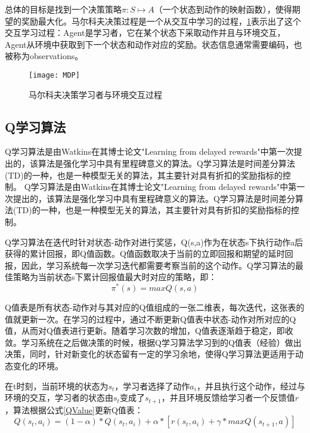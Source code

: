总体的目标是找到一个决策策略$\pi :S\longmapsto A$（一个状态到动作的映射函数），使得期望的奖励最大化。马尔科夫决策过程是一个从交互中学习的过程，\ref{Interaction}表示出了这个交互学习过程：Agent是学习者，它在某个状态下采取动作并且与环境交互，Agent从环境中获取到下一个状态和动作对应的奖励。状态信息通常需要编码，也被称为observations。
\begin{figure}[h]
    \centering
    \texttt{[image: MDP]}
    \caption{马尔科夫决策学习者与环境交互过程}
    \label{Interaction}
\end{figure}

\subsection{Q学习算法}
Q学习算法\cite{QLearning2}是由Watkins在其博士论文"Learning from delayed rewards"\cite{QLearning0}中第一次提出的，该算法是强化学习中具有里程碑意义的算法。Q学习算法是时间差分算法(TD)\cite{QLearning1}的一种，也是一种模型无关的算法，其主要针对具有折扣的奖励指标的控制。
Q学习算法\cite{QLearning2}是由Watkins在其博士论文"Learning from delayed rewards"\cite{QLearning0}中第一次提出的，该算法是强化学习中具有里程碑意义的算法。Q学习算法是时间差分算法(TD)\cite{QLearning1}的一种，也是一种模型无关的算法，其主要针对具有折扣的奖励指标的控制。

Q学习算法在迭代时针对状态-动作对进行奖惩，Q(s,a)作为在状态s下执行动作a后获得的累计回报，即Q值函数。Q值函数取决于当前的立即回报和期望的延时回报，因此，学习系统每一次学习迭代都需要考察当前的这个动作。Q学习算法的最佳策略为当前状态s下累计回报值最大时对应的策略，即：
\begin{equation}
    \pi^*(s) = max Q(s,a)
\end{equation}

Q值表是所有状态-动作对与其对应的Q值组成的一张二维表，每次迭代，这张表的值就更新一次。在学习的过程中，通过不断更新Q值表中状态-动作对所对应的Q值，从而对Q值表进行更新。随着学习次数的增加，Q值表逐渐趋于稳定，即收敛。学习系统在之后做决策的时候，根据Q学习算法学习到的Q值表（经验）做出决策，同时，针对新变化的状态留有一定的学习余地，使得Q学习算法更适用于动态变化的环境。

在t时刻，当前环境的状态为$s_t$，学习者选择了动作$a_i$，并且执行这个动作，经过与环境的交互，学习者的状态由$s_t$变成了$s_{t+1}$，并且环境反馈给学习者一个反馈值$r$，算法根据公式\ref{QValue}\cite{RLIntroduction}更新Q值表：
\begin{equation}
    \label{QValue}
    Q(s_t,a_i)=(1-\alpha)*Q(s_t,a_i)+\alpha *[r(s_t,a_i)+\gamma *maxQ(s_{t+1},a)]
\end{equation}

